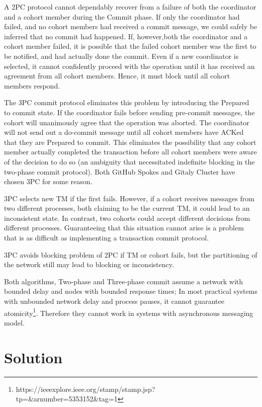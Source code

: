 \documentclass[sigplan, screen, nonacm, 11pt]{acmart}
\begin{document}
A 2PC protocol cannot dependably recover from a failure of both the coordinator and a cohort member during the Commit phase.
If only the coordinator had failed, and no cohort members had received a commit message, we could safely be inferred
that no commit had happened.
If, however,both the coordinator and a cohort member failed, it is possible that the failed cohort member was the first
to be notified, and had actually done the commit.
Even if a new coordinator is selected, it cannot confidently proceed with the operation until it has received
an agreement from all cohort members. Hence, it must block until all cohort members respond.

The 3PC commit protocol eliminates this problem by introducing the Prepared to commit state.
If the coordinator fails before sending pre-commit messages, the cohort will unanimously agree that the operation was aborted.
The coordinator will not send out a do-commit message until all cohort members have ACKed that they are Prepared to commit.
This eliminates the possibility that any cohort member actually completed the transaction before all cohort
members were aware of the decision to do so (an ambiguity that necessitated indefinite blocking
in the two-phase commit protocol). Both GitHub Spokes and Gitaly Cluster have chosen 3PC for some reason.

3PC selects new TM if the first fails.
However, if a cohort receives messages from two different processes,
both claiming to be the current TM, it could lead to an inconsistent state.
In contrast, two cohorts could accept different decisions from different processes.
Guaranteeing that this situation cannot arise is a problem
that is as difficult as implementing a transaction commit protocol.

3PC avoids blocking problem of 2PC if TM or cohort fails,
but the partitioning of the network still may lead to blocking or inconsistency.

Both algorithms, Two-phase and Three-phase commit assume a network with bounded delay and nodes with bounded response times;
In most practical systems with unbounded network delay and process pauses, it cannot guarantee atomicity\footnote{https://ieeexplore.ieee.org/stamp/stamp.jsp?tp=\&arnumber=5353152\&tag=1}.
Therefore they cannot work in systems with asynchronous messaging model.

\section{Solution}
\end{document}
